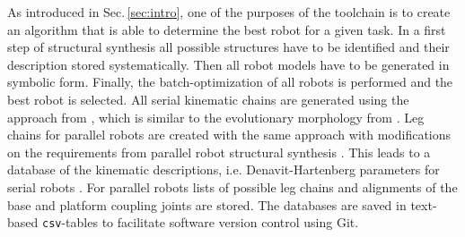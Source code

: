 \documentclass[runningheads]{llncs}
\begin{document}

As introduced in Sec.\,\ref{sec:intro}, one of the purposes of the toolchain is to create an algorithm that is able to determine the best robot for a given task.
In a first step of structural synthesis all possible structures have to be identified and their description stored systematically.
Then all robot models have to be generated in symbolic form.
Finally, the batch-optimization of all robots is performed and the best robot is selected.
All serial kinematic chains are generated using the approach from \cite{Ramirez2018}, which is similar to the evolutionary morphology from \cite{Gogu2008}.
Leg chains for parallel robots are created with the same approach with modifications on the requirements from parallel robot structural synthesis \cite{KongGos2007,Gogu2008}.
This leads to a database of the kinematic descriptions, i.e.  Denavit-Hartenberg parameters for serial robots \cite{KhalilDom2002}. %
For parallel robots lists of possible leg chains and alignments of the base and platform coupling joints are stored.
The databases are saved in text-based \texttt{csv}-tables to facilitate software version control using Git.
\end{document}
